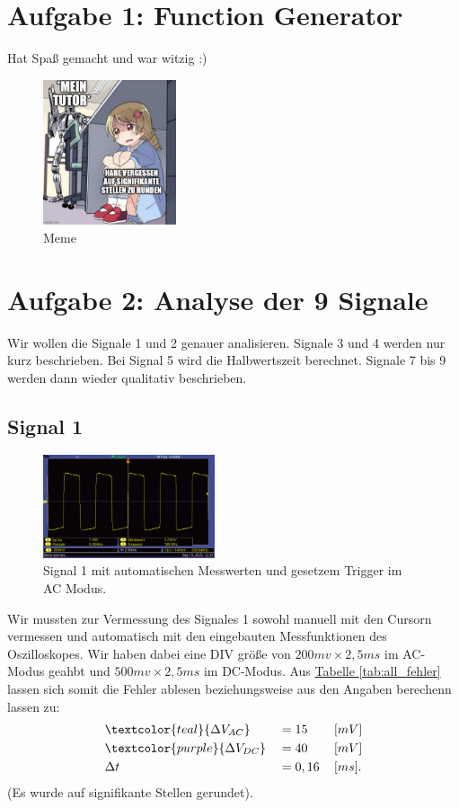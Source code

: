 \twocolumn

\section{Aufgabe 1: Function Generator}
Hat Spaß gemacht und war witzig :)
\begin{figure} [h!]
    \centering
        \includegraphics[width=0.35\textwidth]{img/25/memes/signifikante3.pdf}
    \caption{Meme}
\end{figure}

\section{Aufgabe 2: Analyse der 9 Signale}

Wir wollen die Signale 1 und 2 genauer analisieren. Signale 3 und 4 werden nur kurz beschrieben. Bei Signal 5 wird die Halbwertszeit berechnet. Signale 7 bis 9 werden dann wieder qualitativ beschrieben.
\subsection*{Signal 1}
\begin{figure} [h!]
    \centering
        \includegraphics[width=0.45\textwidth]{img/25/Signale2/Signal1-Messwerte.pdf}
    \caption{Signal 1 mit automatischen Messwerten und gesetzem Trigger im AC Modus.}
\end{figure}
Wir mussten zur Vermessung des Signales 1 sowohl manuell mit den Cursorn vermessen und automatisch mit den eingebauten Messfunktionen des Oszilloskopes.
Wir haben dabei eine DIV größe von $200mv \times 2,5ms$ im AC-Modus geahbt und $500mv \times 2,5ms$ im DC-Modus. Aus \hyperref[tab:all_fehler]{Tabelle \ref*{tab:all_fehler}} lassen sich somit die Fehler ablesen beziehungsweise aus den Angaben berechenn lassen zu:
\begin{align}
    &\textcolor{teal}{\Delta V_{AC}} &&= 15\, &&[mV] \\
    &\textcolor{purple}{\Delta V_{DC}} &&= 40\, &&[mV] \\
    &\Delta t &&= 0,16 \, &&[ms].
\end{align}
(Es wurde auf signifikante Stellen gerundet).

